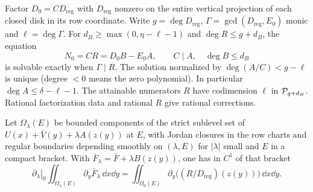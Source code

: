 \begin{lemma}
\label{lem:whole-disk-division}Factor $D_0=C D_{\mathrm{reg}}$ with $D_{\mathrm{reg}}$ nonzero on the entire vertical projection of each closed disk in its row coordinate. Write $g=\deg D_{\mathrm{reg}}$, $\Gamma=\gcd(D_{\mathrm{reg}},E_0)$ monic and $\ell=\deg \Gamma$. For $d_B\ge\max(0,\eta-\ell-1)$ and $\deg R\le g+d_B$, the equation
\begin{equation}\label{eq:bezout-rep}
 N_0=C R=D_0B-E_0A,\qquad C\mid A,\quad \deg B\le d_B
\end{equation}
is solvable exactly when $\Gamma\mid R$. The solution normalized by $\deg(A/C)<g-\ell$ is unique (degree $<0$ means the zero polynomial). In particular $\deg A\le\delta-\ell-1$. The attainable numerators $R$ have codimension $\ell$ in $\mathcal{P}_{g+d_B}$. Rational factorization data and rational $R$ give rational corrections.

Let $\Omega_\lambda(E)$ be bounded components of the strict sublevel set of $U(x)+\bar V(y)+\lambda A(z(y))$ at $E$, with Jordan closures in the row charts and regular boundaries depending smoothly on $(\lambda,E)$ for $|\lambda|$ small and $E$ in a compact bracket. With $\bar F_\lambda=\bar F+\lambda B(z(y))$, one has in $C^1$ of that bracket
\begin{equation}\label{eq:shape-derivative-green}
 \left.\partial_\lambda\right|_0\iint_{\Omega_\lambda(E)}\partial_y\bar F_\lambda\,\dd x\dd y
  =\iint_{\Omega_0(E)}\partial_y\bigl((R/D_{\mathrm{reg}})(z(y))\bigr)\,\dd x\dd y .
\end{equation}
\end{lemma}

